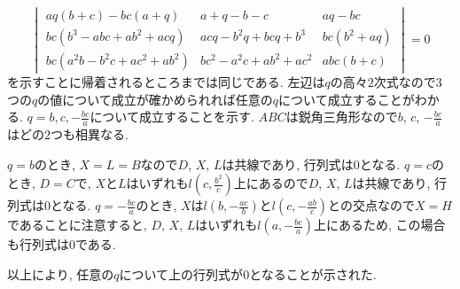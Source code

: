\begin{ifsoll*}
\[\begin{vmatrix}
aq(b+c)-bc(a+q)&a+q-b-c&aq-bc\\
bc(b^3-abc+ab^2+acq)&acq-b^2q+bcq+b^3&bc(b^2+aq)\\
bc(a^2b-b^2c+ac^2+ab^2)&bc^2-a^2c+ab^2+ac^2&abc(b+c)
\end{vmatrix}=0\]
を示すことに帰着されるところまでは同じである.
左辺は$q$の高々$2$次式なので$3$つの$q$の値について成立が確かめられれば任意の$q$について成立することがわかる.
$q=b,c,-\frac{bc}a$について成立することを示す.
$ABC$は鋭角三角形なので$b$, $c$, $-\frac{bc}a$はどの$2$つも相異なる.

$q=b$のとき, $X=L=B$なので$D$, $X$, $L$は共線であり, 行列式は$0$となる.
$q=c$のとき, $D=C$で, $X$と$L$はいずれも$l(c,\frac{b^2}c)$上にあるので$D$, $X$, $L$は共線であり, 行列式は$0$となる.
$q=-\frac{bc}a$のとき, $X$は$l(b,-\frac{ac}b)$と$l(c,-\frac{ab}c)$との交点なので$X=H$であることに注意すると, $D$, $X$, $L$はいずれも$l(a,-\frac{bc}a)$上にあるため, この場合も行列式は$0$である.

以上により, 任意の$q$について上の行列式が$0$となることが示された.
\end{ifsoll*}